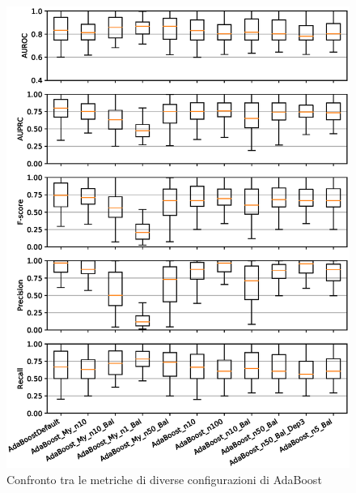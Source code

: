 \documentclass[12pt,a4paper,oneside,hidelinks]{report}
\begin{document}
\begin{figure}[hb]%
    \centering
    \includegraphics[scale = 0.80]{CC-AdaBoost-level1.eps}%
    \caption{Confronto tra le metriche di diverse configurazioni di AdaBoost}%
    \label{figure:liv1.1}%
\end{figure}

\vspace*{\fill}

\vspace*{\fill}
\end{document}
